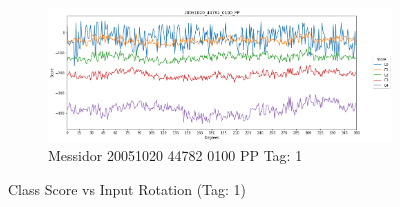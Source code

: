 \begin{figure}[ht!]
\begin{subfigure}[b]{ 0.85\textwidth}
		\centering
		\includegraphics[width=\textwidth]{Figures/chapter_stability/20051020_44782_0100_PP/r/scores.png}
		\caption{Messidor 20051020 44782 0100 PP Tag: 1}		
	\end{subfigure}
	\hfill 
	\caption[Score vs Rotation (Tag: 1)]{Class Score vs Input Rotation (Tag: 1)}  
	\label{sta:fig:rot1} 
\end{figure}

